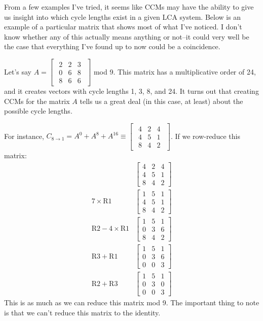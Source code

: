 \documentclass[a4paper, reqno, 12pt]{amsart}
\begin{document}
	From a few examples I've tried, it seems like CCMs may have the ability to give us insight into which cycle lengths exist in a given LCA system. Below is an example of
	a particular matrix that shows most of what I've noticed. I don't know whether any of this actually means anything or not--it could very well be the case that everything
	I've found up to now could be a coincidence.
	
	Let's say $A = 
	\begin{bmatrix}
		\begin{smallmatrix}
			2 & 2 & 3 \\
			0 & 6 & 8 \\
			8 & 6 & 6
		\end{smallmatrix}
	\end{bmatrix}$ mod 9. This matrix has a multiplicative order of 24, and it creates vectors with cycle lengths 1, 3, 8, and 24. It turns out that creating CCMs for the
	matrix $A$ tells us a great deal (in this case, at least) about the possible cycle lengths.
	
	For instance, $C_{8 \rightarrow 1} = A^0 + A^8 + A^{16} \equiv 
	\begin{bmatrix}
		\begin{smallmatrix}
			4 & 2 & 4 \\
			4 & 5 & 1 \\
			8 & 4 & 2
		\end{smallmatrix}
	\end{bmatrix}$. If we row-reduce this matrix:
	\begin{align*}
		& 
		\begin{bmatrix}
			4 & 2 & 4 \\
			4 & 5 & 1 \\
			8 & 4 & 2
		\end{bmatrix} \\
		7 \times \text{R}1 & 
		\begin{bmatrix}
			1 & 5 & 1 \\
			4 & 5 & 1 \\
			8 & 4 & 2
		\end{bmatrix} \\
		\text{R}2 - 4 \times \text{R}1 &
		\begin{bmatrix}
			1 & 5 & 1 \\
			0 & 3 & 6 \\
			8 & 4 & 2
		\end{bmatrix} \\
		\text{R}3 + \text{R}1 &
		\begin{bmatrix}
			1 & 5 & 1 \\
			0 & 3 & 6 \\
			0 & 0 & 3
		\end{bmatrix} \\
		\text{R}2 + \text{R}3 &
		\begin{bmatrix}
			1 & 5 & 1 \\
			0 & 3 & 0 \\
			0 & 0 & 3
		\end{bmatrix}
	\end{align*}
	This is as much as we can reduce this matrix mod 9. The important thing to note is that we can't reduce this matrix to the identity.
	
\end{document}
